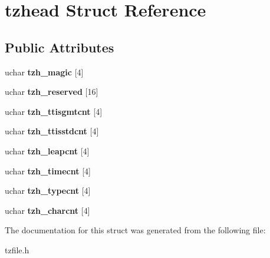 \hypertarget{structtzhead}{}\section{tzhead Struct Reference}
\label{structtzhead}
\subsection*{Public Attributes}
\begin{DoxyCompactItemize}
\item 
\mbox{\label{structtzhead_a4a2b4051febcd6771e230f8d9d19cd29}} 
uchar {\bfseries tzh\+\_\+magic} \mbox{[}4\mbox{]}
\item 
\mbox{\label{structtzhead_a4275e8e7544d1c4e6b5dc1193abc8e33}} 
uchar {\bfseries tzh\+\_\+reserved} \mbox{[}16\mbox{]}
\item 
\mbox{\label{structtzhead_a058bf25ef6e52adbe792cae5c80a94cd}} 
uchar {\bfseries tzh\+\_\+ttisgmtcnt} \mbox{[}4\mbox{]}
\item 
\mbox{\label{structtzhead_aecf06395aa37ec25c6bc736c1658ee0e}} 
uchar {\bfseries tzh\+\_\+ttisstdcnt} \mbox{[}4\mbox{]}
\item 
\mbox{\label{structtzhead_a19006410705c487870895a1dca5334a0}} 
uchar {\bfseries tzh\+\_\+leapcnt} \mbox{[}4\mbox{]}
\item 
\mbox{\label{structtzhead_a4244d944d6c4132d71931da4c7d70a03}} 
uchar {\bfseries tzh\+\_\+timecnt} \mbox{[}4\mbox{]}
\item 
\mbox{\label{structtzhead_ae1f4ee40740e784712d3b03841a1ecc6}} 
uchar {\bfseries tzh\+\_\+typecnt} \mbox{[}4\mbox{]}
\item 
\mbox{\label{structtzhead_adc3d02002c88d882bea149cecf55490f}} 
uchar {\bfseries tzh\+\_\+charcnt} \mbox{[}4\mbox{]}
\end{DoxyCompactItemize}


The documentation for this struct was generated from the following file\+:\begin{DoxyCompactItemize}
\item 
tzfile.\+h\end{DoxyCompactItemize}
